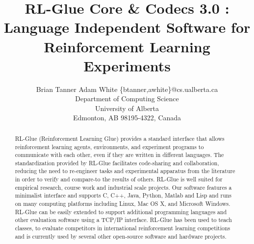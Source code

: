 \documentclass[twopage,11pt]{article}
\begin{document}
\title{RL-Glue Core \& Codecs 3.0 : Language Independent Software  for Reinforcement Learning Experiments}



\author{\name Brian Tanner \AND Adam White  \email \{btanner,awhite\}@cs.ualberta.ca \\
       \addr Department of Computing Science\\
       University of Alberta\\
       Edmonton, AB 98195-4322, Canada}


\maketitle

\begin{abstract}
RL-Glue (Reinforcement Learning Glue) provides a standard interface that allows reinforcement learning agents, environments, and experiment programs to communicate with each other, even if they are written in different languages. The standardization provided by RL-Glue facilitates code-sharing and collaboration, reducing the need to re-engineer tasks and experimental apparatus from the literature in order to verify and compare-to the results of others.
RL-Glue is well suited for empirical research, course work and industrial scale projects. Our software features a minimalist interface and supports C, C++, Java, Python, Matlab and Lisp and runs on many computing platforms including Linux, Mac OS X, and Microsoft Windows. RL-Glue can be easily extended to support additional programming languages and other evaluation software using a TCP/IP interface. RL-Glue has been used to teach classes, to evaluate competitors in international reinforcement learning competitions and is currently used by several other open-source software and hardware projects.
\end{abstract}
\end{document}
